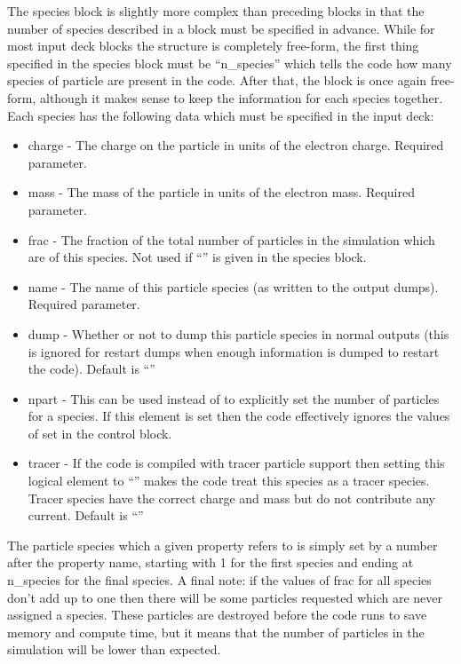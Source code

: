 The species block is slightly more complex than preceding blocks in that the
number of species described in a block must be specified in advance. While
for most input deck blocks the structure is completely free-form, the first
thing specified in the species block must be ``n\_species'' which tells the
code how many species of particle are present in the code. After that, the
block is once again free-form, although it makes sense to keep the information
for each species together. Each species has the following data which must be
specified in the input deck:\\
\begin{itemize}
\item charge - The charge on the particle in units of the electron charge.
  Required parameter.
\item mass - The mass of the particle in units of the electron mass.
  Required parameter.
\item frac - The fraction of the total number of particles in the simulation
  which are of this species. Not used if ``'' is given in
  the species block.
\item name - The name of this particle species (as written to the output
  dumps). Required parameter.
\item dump - Whether or not to dump this particle species in normal outputs
  (this is ignored for restart dumps when enough information is dumped to
  restart the code). Default is ``''
\item npart - This can be used instead of  to explicitly set
  the number of particles for a species. If this element is set then the code
  effectively ignores the values of  set in the control
  block.
\item tracer - If the code is compiled with tracer particle support then
  setting this logical element to ``'' makes the code treat this
  species as a tracer species. Tracer species have the correct charge and mass
  but do not contribute any current. Default is ``''
\end{itemize}

The particle species which a given property refers to is simply set by a
number after the property name, starting with 1 for the first species and
ending at n\_species for the final species. A final note: if the values of
frac for all species don't add up to one then there will be some particles
requested which are never assigned a species. These particles are destroyed
before the code runs to save memory and compute time, but it means that the
number of particles in the simulation will be lower than expected.\\

